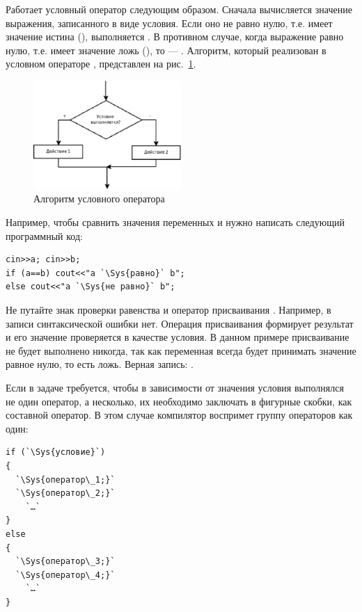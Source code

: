 Работает условный оператор следующим образом. Сначала вычисляется значение выражения, записанного в виде условия. Если
оно не равно нулю, т.е. имеет значение истина (), выполняется . В
противном случае, когда выражение равно нулю, т.е. имеет значение ложь (), то ---
. Алгоритм, который реализован в условном операторе , представлен на
рис.~\ref{ch03:refDrawing7}.

\begin{figure}[htb]
\begin{center}
\includegraphics[width=0.5\textwidth]{img/ris_3_8}
\caption{Алгоритм условного оператора }
\label{ch03:refDrawing7}
\end{center}
\end{figure}

Например, чтобы сравнить значения переменных  и  нужно написать следующий
программный код:
\begin{lstlisting}
cin>>a; cin>>b;
if (a==b) cout<<"a `\Sys{равно}` b";
else cout<<"a `\Sys{не равно}` b";
\end{lstlisting}

 Не путайте знак проверки равенства \Sys{==} и оператор присваивания
\Sys{=}. Например, в записи  синтаксической ошибки нет. Операция
присваивания  формирует результат и его значение проверяется в качестве условия. В данном примере
присваивание  не будет выполнено никогда, так как переменная  всегда будет
принимать значение равное нулю, то есть ложь. Верная запись: 
.

 Если в задаче требуется, чтобы в зависимости от значения условия выполнялся не один оператор, а
несколько, их необходимо заключать в фигурные скобки, как составной оператор. В этом случае компилятор воспримет группу
операторов как один:
\begin{lstlisting}
if (`\Sys{условие}`) 
{
  `\Sys{оператор\_1;}`
  `\Sys{оператор\_2;}`
    `…`
}
else 
{
  `\Sys{оператор\_3;}`
  `\Sys{оператор\_4;}`
    `…`
}
\end{lstlisting}

